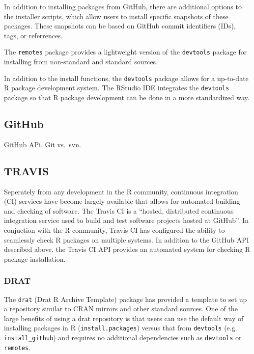 \documentclass[]{elsarticle} %
\begin{document}
In addition to installing packages from GitHub, there are additional
options to the installer scripts, which allow users to install specific
snapshots of these packages. These snapshots can be based on GitHub
commit identifiers (IDs), tags, or referrences.

The \texttt{remotes} package provides a lightweight version of the
\texttt{devtools} package for installing from non-standard and standard
sources.

In addition to the install functions, the \texttt{devtools} package
allows for a up-to-date R package development system. The RStudio IDE
integrates the \texttt{devtools} package so that R package development
can be done in a more standardized way.

\subsection{GitHub}\label{github}

GitHub APi. Git vs.~svn.

\subsection{TRAVIS}\label{travis}

Seperately from any development in the R community, continuous
integration (CI) services have become largely available that allows for
automated building and checking of software. The Travis CI is a
``hosted, distributed continuous integration service used to build and
test software projects hosted at GitHub''. In conjuction with the R
community, Travis CI has configured the ability to seamlessly check R
packages on multiple systems. In addition to the GitHub API described
above, the Travis CI API provides an automated system for checking R
package installation.

\subsubsection{DRAT}\label{drat}

The \texttt{drat} (Drat R Archive Template) package has provided a
template to set up a repository similar to CRAN mirrors and other
standard sources. One of the large benefits of using a drat repository
is that users can use the default way of installing packages in R
(\texttt{install.packages}) versus that from \texttt{devtools} (e.g.
\texttt{install\_github}) and requires no additional dependencies such
as \texttt{devtools} or \texttt{remotes}.
\end{document}
